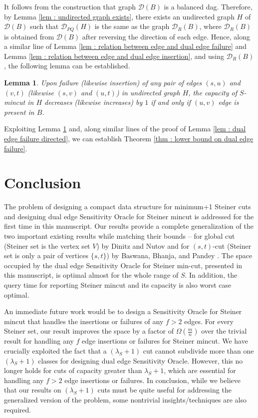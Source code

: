 \documentclass[letterpaper,11pt]{article}
\newtheorem{lemma}{Lemma}[]
\begin{document}
It follows from the construction that graph ${\mathcal D}(B)$ is a balanced dag. Therefore, by Lemma \ref{lem : undirected graph exists}, there exists an undirected graph $H$ of ${\mathcal D}(B)$ such that ${\mathcal D}_{PQ}(H)$ is the same as the graph ${\mathcal D}_R(B)$, where ${\mathcal D}_R(B)$ is obtained from ${\mathcal D}(B)$ after reversing the direction of each edge. Hence, along a similar line of Lemma \ref{lem : relation between edge and dual edge failure} and Lemma \ref{lem : relation between edge and dual edge insertion}, and using ${\mathcal D}_R(B)$, the following lemma can be established.
\begin{lemma} \label{lem : undirected lower bound}
    Upon failure (likewise insertion) of any pair of edges $(s,u)$ and $(v,t)$ (likewise $(s,v)$ and $(u,t)$) in undirected graph $H$, the capacity of $S$-mincut in $H$ decreases (likewise increases) by $1$ if and only if $(u,v)$ edge is present in $B$.
\end{lemma}
Exploiting Lemma \ref{lem : undirected lower bound} and, along similar lines of the proof of Lemma \ref{lem : dual edge failure directed}, we can establish Theorem \ref{thm : lower bound on dual edge failure}.






\section{Conclusion} \label{sec : conclusion}
The problem of designing a compact data structure for minimum+1 Steiner cuts and designing dual edge Sensitivity Oracle for Steiner mincut is addressed for the first time in this manuscript. Our results provide a complete generalization of the two important existing results while matching their bounds -- for global cut (Steiner set is the vertex set $V$) by Dinitz and Nutov \cite{DBLP:conf/stoc/DinitzN95} and for $(s,t)$-cut (Steiner set is only a pair of vertices $\{s,t\}$) by Baswana, Bhanja, and Pandey \cite{DBLP:journals/talg/BaswanaBP23}. The space occupied by the dual edge Sensitivity Oracle for Steiner min-cut, presented in this manuscript, is optimal almost for the whole range of $S$. In addition, the query time for reporting Steiner mincut and its capacity is also worst case optimal.

An immediate future work would be to design a Sensitivity Oracle for Steiner mincut that handles the insertions or failures of any $f>2$ edges. For every Steiner set, our result improves the space by a factor of $\Omega(\frac{m}{n})$ over the trivial result 
for handling any $f$ edge insertions or failures for Steiner mincut.
We have crucially exploited the fact that a $(\lambda_S+1)$ cut cannot subdivide more than one $(\lambda_S+1)$ classes for designing dual edge Sensitivity Oracle. However, this no longer holds for cuts of capacity greater than $\lambda_S+1$, which are essential for handling any $f>2$ edge insertions or failures. In conclusion, while we believe that our results on $(\lambda_S+1)$ cuts must be quite useful for addressing the generalized version of the problem, some nontrivial insights/techniques are also required.
\end{document}
